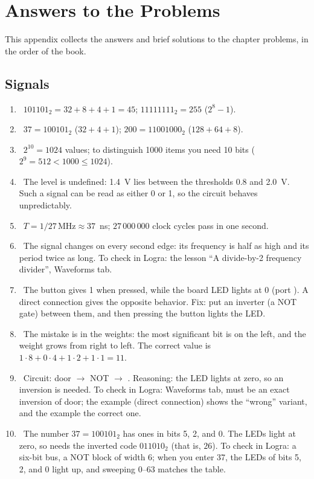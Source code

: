 \chapter{Answers to the Problems}
\label{app:answers}

This appendix collects the answers and brief solutions to the chapter problems, in the order of the book.

\section*{Signals}
\begin{enumerate}
  \item {}~$101101_2=32+8+4+1=45$; $11111111_2=255$ ($2^8-1$).
  \item {}~$37=100101_2$ ($32+4+1$); $200=11001000_2$ ($128+64+8$).
  \item {}~$2^{10}=1024$ values; to distinguish 1000 items you need 10 bits ($2^9=512<1000\le 1024$).
  \item {}~The level is undefined: 1.4~V lies between the thresholds 0.8 and 2.0~V. Such a signal can be read as either 0 or 1, so the circuit behaves unpredictably.
  \item {}~$T = 1/27\,\text{MHz}\approx 37$~ns; $27\,000\,000$ clock cycles pass in one second.
  \item {}~The signal changes on every second edge: its frequency is half as high and its period twice as long. To check in Logra: the lesson ``A divide-by-2 frequency divider'', Waveforms tab.
  \item {}~The button gives 1 when pressed, while the board LED lights at 0 (port ). A direct connection gives the opposite behavior. Fix: put an inverter (a NOT gate) between them, and then pressing the button lights the LED.
  \item {}~The mistake is in the weights: the most significant bit is on the left, and the weight grows from right to left. The correct value is $1\cdot8+0\cdot4+1\cdot2+1\cdot1=11$.
  \item {}~Circuit: door $\to$ NOT $\to$ . Reasoning: the LED lights at zero, so an inversion is needed. To check in Logra: Waveforms tab,  must be an exact inversion of door; the  example (direct connection) shows the ``wrong'' variant, and the  example the correct one.
  \item {}~The number $37=100101_2$ has ones in bits 5, 2, and 0. The LEDs light at zero, so  needs the inverted code $011010_2$ (that is, $26$). To check in Logra: a six-bit bus, a NOT block of width 6; when you enter 37, the LEDs of bits 5, 2, and 0 light up, and sweeping 0--63 matches the table.
\end{enumerate}

